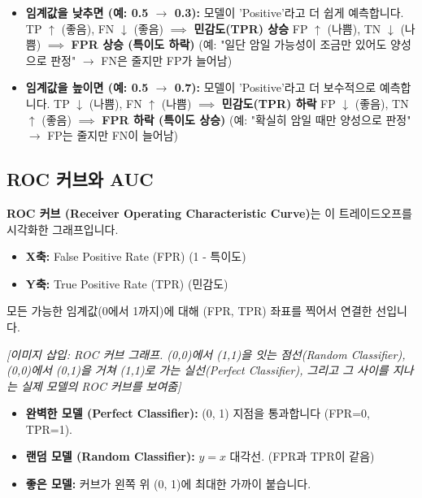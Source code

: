 \documentclass[11pt,a4paper]{book}
\theoremstyle{definition}
\begin{document}
\begin{itemize}
  \item \textbf{임계값을 낮추면 (예: 0.5 $\to$ 0.3):}
      모델이 'Positive'라고 더 쉽게 예측합니다.
      TP $\uparrow$ (좋음), FN $\downarrow$ (좋음) $\implies$ \textbf{민감도(TPR) 상승}
      FP $\uparrow$ (나쁨), TN $\downarrow$ (나쁨) $\implies$ \textbf{FPR 상승 (특이도 하락)}
      (예: "일단 암일 가능성이 조금만 있어도 양성으로 판정" $\to$ FN은 줄지만 FP가 늘어남)

  \item \textbf{임계값을 높이면 (예: 0.5 $\to$ 0.7):}
      모델이 'Positive'라고 더 보수적으로 예측합니다.
      TP $\downarrow$ (나쁨), FN $\uparrow$ (나쁨) $\implies$ \textbf{민감도(TPR) 하락}
      FP $\downarrow$ (좋음), TN $\uparrow$ (좋음) $\implies$ \textbf{FPR 하락 (특이도 상승)}
      (예: "확실히 암일 때만 양성으로 판정" $\to$ FP는 줄지만 FN이 늘어남)
\end{itemize}

\subsection{ROC 커브와 AUC}

\textbf{ROC 커브 (Receiver Operating Characteristic Curve)}는
이 트레이드오프를 시각화한 그래프입니다.

\begin{itemize}
  \item \textbf{X축:} False Positive Rate (FPR) (1 - 특이도)
  \item \textbf{Y축:} True Positive Rate (TPR) (민감도)
\end{itemize}

모든 가능한 임계값(0에서 1까지)에 대해 (FPR, TPR) 좌표를 찍어서 연결한 선입니다.


\textit{[이미지 삽입: ROC 커브 그래프. (0,0)에서 (1,1)을 잇는 점선(Random Classifier),
(0,0)에서 (0,1)을 거쳐 (1,1)로 가는 실선(Perfect Classifier),
그리고 그 사이를 지나는 실제 모델의 ROC 커브를 보여줌]}

\begin{itemize}
  \item \textbf{완벽한 모델 (Perfect Classifier):} (0, 1) 지점을 통과합니다 (FPR=0, TPR=1).
  \item \textbf{랜덤 모델 (Random Classifier):} $y=x$ 대각선. (FPR과 TPR이 같음)
  \item \textbf{좋은 모델:} 커브가 왼쪽 위 (0, 1)에 최대한 가까이 붙습니다.
\end{itemize}
\end{document}
